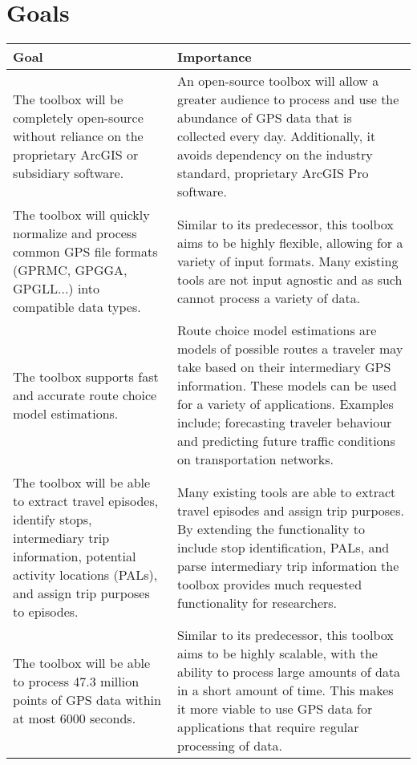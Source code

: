 \documentclass{article}
\begin{document}
\section{Goals}
\begin{table}[h!]
    \centering
        \begin{tabular}{|p{6cm}|p{6cm}|}
    		\hline
    		\textbf{Goal} & \textbf{Importance} \\
    		\hline
    		The toolbox will be completely open-source without reliance on the proprietary ArcGIS or subsidiary software. & An open-source toolbox will allow a greater audience to process and use the abundance of GPS data that is collected every day. Additionally, it avoids dependency on the industry standard, proprietary ArcGIS Pro software. \\
    		\hline
    		The toolbox will quickly normalize and process common GPS file formats (GPRMC, GPGGA, GPGLL...) into compatible data types. & Similar to its predecessor, this toolbox aims to be highly flexible, allowing for a variety of input formats. Many existing tools are not input agnostic and as such cannot process a variety of data.  \\
    		\hline
    		The toolbox supports fast and accurate route choice model estimations. & Route choice model estimations are models of possible routes a traveler may take based on their intermediary GPS information. These models can be used for a variety of applications. Examples include; forecasting traveler behaviour and predicting future traffic conditions on transportation networks. \\
    		\hline
    		The toolbox will be able to extract travel episodes, identify stops, intermediary trip information, potential activity locations (PALs), and assign trip purposes to episodes. & Many existing tools are able to extract travel episodes and assign trip purposes. By extending the functionality to include stop identification, PALs, and parse intermediary trip information the toolbox provides much requested functionality for researchers. \\
    		\hline
    		The toolbox will be able to process 47.3 million points of GPS data within at most 6000 seconds. & Similar to its predecessor, this toolbox aims to be highly scalable, with the ability to process large amounts of data in a short amount of time. This makes it more viable to use GPS data for applications that require regular processing of data.\\
    		\hline
    	\end{tabular}
		
\end{table}
\end{document}
